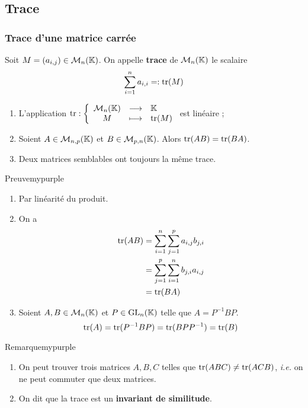\subsection{Trace}

    \subsubsection{Trace d’une matrice carrée}

    \begin{defitheo}{}{}
        Soit $M = (a_{i,j}) \in \mathcal{M}_{n}(\mathbb{K})$. On appelle \textbf{trace} de $\mathcal{M}_{n}(\mathbb{K})$ le scalaire \[ \sum_{i=1}^{n} a_{i,i} =: \operatorname{tr}(M) \]  
        \begin{enumerate}
            \item L’application $\fonction{\tr}{\mk{n}}{\mathbb{K}}{M}{\tr(M)}$ est linéaire ;
            \item Soient $A \in \mathcal{M}_{n,p}(\mathbb{K})$ et $B \in \mathcal{M}_{p,n}(\mathbb{K})$. Alors $\operatorname{tr}(AB) = \operatorname{tr}(BA)$.
            \item Deux matrices semblables ont toujours la même trace.
        \end{enumerate} 
    \end{defitheo}

    \begin{demo}{Preuve}{mypurple}
        \begin{enumerate}
            \item Par linéarité du produit.
            \item On a 
            \begin{align*}
                \operatorname{tr}(AB) 
                &= \sum_{i=1}^{n} \sum_{j=1}^{p} a_{i,j} b_{j,i} \\
                &= \sum_{j=1}^{p} \sum_{i=1}^{n} b_{j,i} a_{i,j} \\
                &= \operatorname{tr}(BA)
            \end{align*}
            \item Soient $A,B \in \mathcal{M}_{n}(\mathbb{K})$ et $P \in \operatorname{GL}_n(\mathbb{K})$ telle que $A = P^{-1} B P$.
            \[ \operatorname{tr}(A) = \operatorname{tr}(P^{-1} B P) = \operatorname{tr}(B P P^{-1}) = \operatorname{tr}(B) \]
        \end{enumerate}
    \end{demo}

    \begin{omed}{Remarque}{mypurple}
        \begin{enumerate}[label=\textcolor{mypurple}{\arabic*.}]
            \item On peut trouver trois matrices $A,B,C$ telles que $\operatorname{tr}(ABC) \neq \operatorname{tr}(ACB)$, \textit{i.e.} on ne peut commuter que deux matrices.
            \item On dit que la trace est un \textbf{invariant de similitude}.
        \end{enumerate}
    \end{omed}

